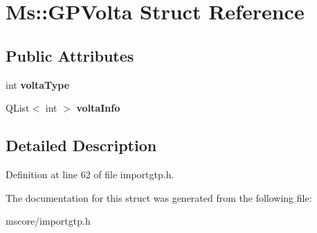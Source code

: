 \hypertarget{struct_ms_1_1_g_p_volta}{}\section{Ms\+:\+:G\+P\+Volta Struct Reference}
\label{struct_ms_1_1_g_p_volta}
\subsection*{Public Attributes}
\begin{DoxyCompactItemize}
\item 
\mbox{\label{struct_ms_1_1_g_p_volta_af44b1d8b7d298e99bf5065d6e3a16119}} 
int {\bfseries volta\+Type}
\item 
\mbox{\label{struct_ms_1_1_g_p_volta_ab99d6753479823639c575097dffc6777}} 
Q\+List$<$ int $>$ {\bfseries volta\+Info}
\end{DoxyCompactItemize}


\subsection{Detailed Description}


Definition at line 62 of file importgtp.\+h.



The documentation for this struct was generated from the following file\+:\begin{DoxyCompactItemize}
\item 
mscore/importgtp.\+h\end{DoxyCompactItemize}
